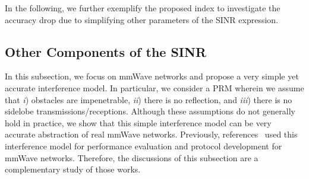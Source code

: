 \documentclass[12pt, draftclsnofoot, onecolumn]{IEEEtran}
\begin{document}
In the following, we further exemplify the proposed index to investigate the accuracy drop due to simplifying other parameters of the SINR expression.

\subsection{Other Components of the SINR}\label{sec: OtherComponents}
In this subsection, we focus on mmWave networks and propose a very simple yet accurate interference model. In particular, we consider a PRM wherein we assume that \emph{i}) obstacles are impenetrable, \emph{ii}) there is no reflection, and \emph{iii}) there is no sidelobe transmissions/receptions. Although these assumptions do not generally hold in practice, we show that this simple interference model can be very accurate abstraction of real mmWave networks.
Previously, references~\cite{Singh2011Interference,Singh2009Blockage} used this interference model for performance evaluation and protocol development for mmWave networks. Therefore, the discussions of this subsection are a complementary study of those works.
\end{document}
